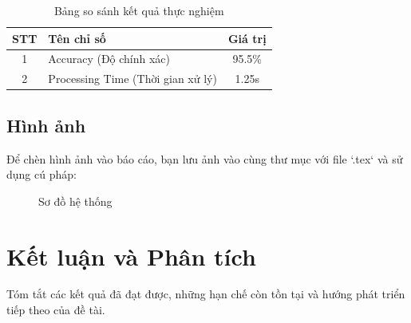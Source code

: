 \documentclass[12pt, a4paper]{article}
\begin{document}
\begin{table}[htbp]
    \centering
    \caption{Bảng so sánh kết quả thực nghiệm}
    \label{tab:ketqua}
    \begin{tabular}{|c|l|c|}
        \hline
        \textbf{STT} & \textbf{Tên chỉ số} & \textbf{Giá trị} \\ \hline
        1 & Accuracy (Độ chính xác) & 95.5\% \\ \hline
        2 & Processing Time (Thời gian xử lý) & 1.25s \\ \hline
    \end{tabular}
\end{table}

\subsection{Hình ảnh}
Để chèn hình ảnh vào báo cáo, bạn lưu ảnh vào cùng thư mục với file `.tex` và sử dụng cú pháp:

\begin{figure}[htbp]
    \centering
    \caption{Sơ đồ hệ thống}
    \label{fig:sodo}
\end{figure}

\section{Kết luận và Phân tích}
Tóm tắt các kết quả đã đạt được, những hạn chế còn tồn tại và hướng phát triển tiếp theo của đề tài.
\end{document}
